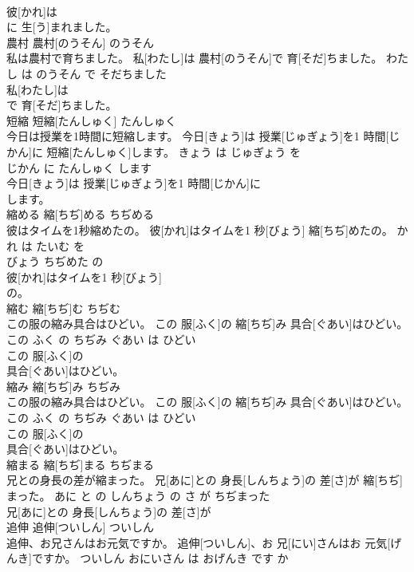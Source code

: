 \documentclass[8pt]{extreport}
\begin{document}
\begin{CJK}{UTF8}{min}
\\	彼[かれ]は
\\	に 生[う]まれました。			
\\	農村	農村[のうそん]	のうそん	
\\	私は農村で育ちました。	私[わたし]は 農村[のうそん]で 育[そだ]ちました。	わたし は のうそん で そだちました	
\\	私[わたし]は
\\	で 育[そだ]ちました。			
\\	短縮	短縮[たんしゅく]	たんしゅく	
\\	今日は授業を1時間に短縮します。	今日[きょう]は 授業[じゅぎょう]を1 時間[じかん]に 短縮[たんしゅく]します。	きょう は じゅぎょう を 
\\	じかん に たんしゅく します	
\\	今日[きょう]は 授業[じゅぎょう]を1 時間[じかん]に
\\	します。			
\\	縮める	縮[ちぢ]める	ちぢめる	
\\	彼はタイムを1秒縮めたの。	彼[かれ]はタイムを1 秒[びょう] 縮[ちぢ]めたの。	かれ は たいむ を 
\\	びょう ちぢめた の	
\\	彼[かれ]はタイムを1 秒[びょう]
\\	の。			
\\	縮む	縮[ちぢ]む	ちぢむ	
\\	この服の縮み具合はひどい。	この 服[ふく]の 縮[ちぢ]み 具合[ぐあい]はひどい。	この ふく の ちぢみ ぐあい は ひどい	
\\	この 服[ふく]の
\\	具合[ぐあい]はひどい。			
\\	縮み	縮[ちぢ]み	ちぢみ	
\\	この服の縮み具合はひどい。	この 服[ふく]の 縮[ちぢ]み 具合[ぐあい]はひどい。	この ふく の ちぢみ ぐあい は ひどい	
\\	この 服[ふく]の
\\	具合[ぐあい]はひどい。			
\\	縮まる	縮[ちぢ]まる	ちぢまる	
\\	兄との身長の差が縮まった。	兄[あに]との 身長[しんちょう]の 差[さ]が 縮[ちぢ]まった。	あに と の しんちょう の さ が ちぢまった	
\\	兄[あに]との 身長[しんちょう]の 差[さ]が
\\	追伸	追伸[ついしん]	ついしん	
\\	追伸、お兄さんはお元気ですか。	追伸[ついしん]、お 兄[にい]さんはお 元気[げんき]ですか。	ついしん おにいさん は おげんき です か	

\end{CJK}
\end{document}
